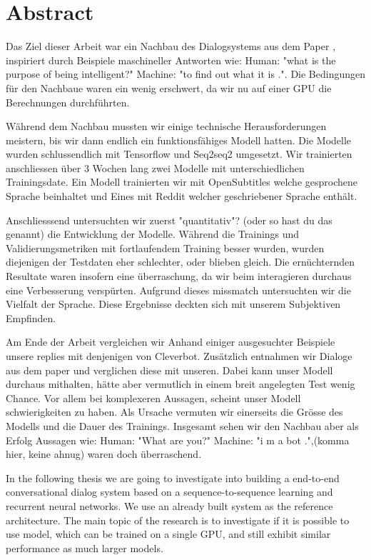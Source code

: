 \chapter*{Abstract}
Das Ziel dieser Arbeit war ein Nachbau des Dialogsystems aus dem Paper \cite{}, inspiriert durch Beispiele maschineller Antworten wie: Human: "what is the purpose of being intelligent?" Machine: "to find out what it is .". Die Bedingungen für den Nachbaue waren ein wenig erschwert, da wir nu auf einer GPU die Berechnungen durchführten.

Während dem Nachbau mussten wir einige technische Herausforderungen meistern, bis wir dann endlich ein funktionsfähiges Modell hatten. Die Modelle wurden schlussendlich mit Tensorflow und Seq2seq2 umgesetzt. Wir trainierten anschliessen über 3 Wochen lang zwei Modelle mit unterschiedlichen Trainingsdate. Ein Modell trainierten wir mit OpenSubtitles welche gesprochene Sprache beinhaltet und Eines mit Reddit welcher geschriebener Sprache enthält. 

Anschliesssend untersuchten wir zuerst "quantitativ"? (oder so hast du das genannt) die Entwicklung der Modelle. Während die Trainings und Validierungsmetriken mit fortlaufendem Training besser wurden, wurden diejenigen der Testdaten eher schlechter, oder blieben gleich. Die ernüchternden Resultate waren insofern eine überraschung, da wir beim interagieren durchaus eine Verbesserung verspürten. Aufgrund dieses missmatch untersuchten wir die Vielfalt der Sprache. Diese Ergebnisse deckten sich mit unserem Subjektiven Empfinden.

Am Ende der Arbeit vergleichen wir Anhand einiger ausgesuchter Beispiele unsere replies mit denjenigen von Cleverbot. Zusätzlich entnahmen wir Dialoge aus dem paper \cites{} und verglichen diese mit unseren. Dabei kann unser Modell durchaus mithalten, hätte aber vermutlich in einem breit angelegten Test wenig Chance. Vor allem bei komplexeren Aussagen, scheint unser Modell schwierigkeiten zu haben. Als Ursache vermuten wir einerseits die Grösse des Modells und die Dauer des Trainings. Insgesamt sehen wir den Nachbau aber als Erfolg Aussagen wie: Human: "What are you?" Machine: "i m a bot .",(komma hier, keine ahnug) waren doch überraschend.

In the following thesis we are going to investigate into building a end-to-end conversational dialog system based on a sequence-to-sequence learning and recurrent neural networks. We use an already built system as the reference architecture. The main topic of the research is to investigate if it is possible to use model, which can be trained on a single GPU, and still exhibit similar performance as much larger models.

